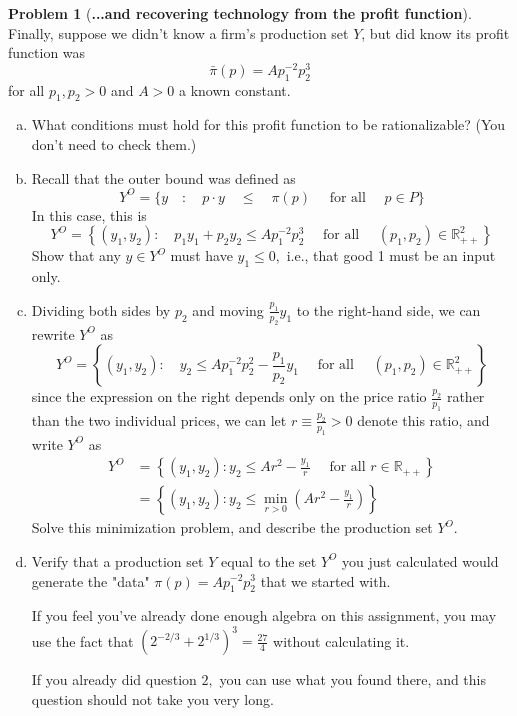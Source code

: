\documentclass{article}
\theoremstyle{definition}
\newtheorem{problem}{Problem}
\begin{document}
\begin{problem}[\textbf{...and recovering technology from the profit function}]
Finally, suppose we didn't know a firm's production set $Y$, but did know its profit function was
$$
\bar{\pi}(p)=A p_{1}^{-2} p_{2}^{3}
$$
for all $p_{1}, p_{2}>0$ and $A>0$ a known constant.
\begin{enumerate}[(a)]
    \item What conditions must hold for this profit function to be rationalizable? (You don't need to check them.)
    \item Recall that the outer bound was defined as
        $$
        Y^{O}=\{y \quad: \quad p \cdot y \quad \leq \quad \pi(p) \quad \text { for all } \quad p \in P\}
        $$
        In this case, this is
        $$
        Y^{O}=\left\{\left(y_{1}, y_{2}\right): \quad p_{1} y_{1}+p_{2} y_{2} \leq A p_{1}^{-2} p_{2}^{3} \quad \text { for all } \quad\left(p_{1}, p_{2}\right) \in \mathbb{R}_{++}^{2}\right\}
    $$
    Show that any $y \in Y^{O}$ must have $y_{1} \leq 0,$ i.e., that good 1 must be an input only.
    \item Dividing both sides by $p_{2}$ and moving $\frac{p_{1}}{p_{2}} y_{1}$ to the right-hand side, we can rewrite $Y^{O}$ as
    $$
    Y^{O}=\left\{\left(y_{1}, y_{2}\right): \quad y_{2} \leq A p_{1}^{-2} p_{2}^{2}-\frac{p_{1}}{p_{2}} y_{1} \quad \text { for all } \quad\left(p_{1}, p_{2}\right) \in \mathbb{R}_{++}^{2}\right\}
    $$
    since the expression on the right depends only on the price ratio $\frac{p_{2}}{p_{1}}$ rather than the two individual prices, we can let $r \equiv \frac{p_{2}}{p_{1}}>0$ denote this ratio, and write $Y^{O}$ as
    $$
    \begin{aligned}
    Y^{O} &=\left\{\left(y_{1}, y_{2}\right): y_{2} \leq A r^{2}-\frac{y_{1}}{r} \quad \text { for all } r \in \mathbb{R}_{++}\right\} \\
    &=\left\{\left(y_{1}, y_{2}\right): y_{2} \leq \min _{r>0}\left(A r^{2}-\frac{y_{1}}{r}\right)\right\}
    \end{aligned}
    $$
    Solve this minimization problem, and describe the production set $Y^{O}$.
    \item  Verify that a production set $Y$ equal to the set $Y^{O}$ you just calculated would generate the "data" $\pi(p)=A p_{1}^{-2} p_{2}^{3}$ that we started with.
    
    If you feel you've already done enough algebra on this assignment, you may use the fact that $\left(2^{-2 / 3}+2^{1 / 3}\right)^{3}=\frac{27}{4}$ without calculating it.
    
    If you already did question $2,$ you can use what you found there, and this question should not take you very long.
    \end{enumerate}
\end{problem}
\end{document}
